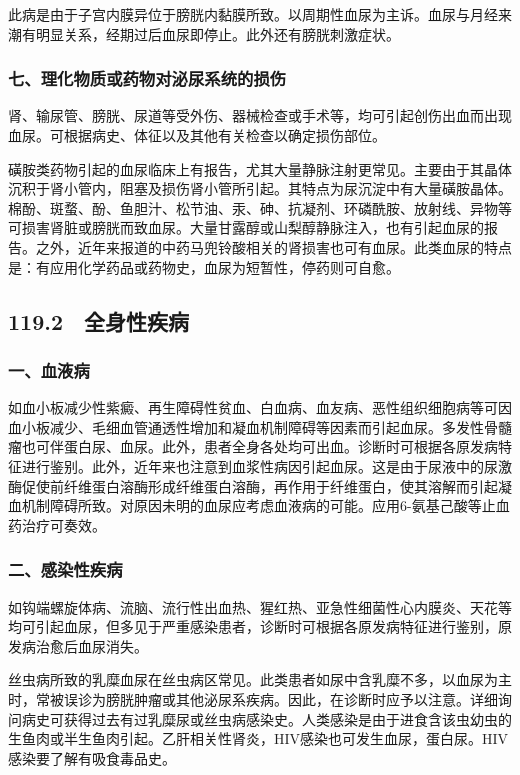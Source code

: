 此病是由于子宫内膜异位于膀胱内黏膜所致。以周期性血尿为主诉。血尿与月经来潮有明显关系，经期过后血尿即停止。此外还有膀胱刺激症状。

\subsubsection{七、理化物质或药物对泌尿系统的损伤}

肾、输尿管、膀胱、尿道等受外伤、器械检查或手术等，均可引起创伤出血而出现血尿。可根据病史、体征以及其他有关检查以确定损伤部位。

磺胺类药物引起的血尿临床上有报告，尤其大量静脉注射更常见。主要由于其晶体沉积于肾小管内，阻塞及损伤肾小管所引起。其特点为尿沉淀中有大量磺胺晶体。棉酚、斑蝥、酚、鱼胆汁、松节油、汞、砷、抗凝剂、环磷酰胺、放射线、异物等可损害肾脏或膀胱而致血尿。大量甘露醇或山梨醇静脉注入，也有引起血尿的报告。之外，近年来报道的中药马兜铃酸相关的肾损害也可有血尿。此类血尿的特点是：有应用化学药品或药物史，血尿为短暂性，停药则可自愈。

\protect\hypertarget{text00278.html}{}{}

\subsection{119.2　全身性疾病}

\subsubsection{一、血液病}

如血小板减少性紫癜、再生障碍性贫血、白血病、血友病、恶性组织细胞病等可因血小板减少、毛细血管通透性增加和凝血机制障碍等因素而引起血尿。多发性骨髓瘤也可伴蛋白尿、血尿。此外，患者全身各处均可出血。诊断时可根据各原发病特征进行鉴别。此外，近年来也注意到血浆性病因引起血尿。这是由于尿液中的尿激酶促使前纤维蛋白溶酶形成纤维蛋白溶酶，再作用于纤维蛋白，使其溶解而引起凝血机制障碍所致。对原因未明的血尿应考虑血液病的可能。应用6-氨基己酸等止血药治疗可奏效。

\subsubsection{二、感染性疾病}

如钩端螺旋体病、流脑、流行性出血热、猩红热、亚急性细菌性心内膜炎、天花等均可引起血尿，但多见于严重感染患者，诊断时可根据各原发病特征进行鉴别，原发病治愈后血尿消失。

丝虫病所致的乳糜血尿在丝虫病区常见。此类患者如尿中含乳糜不多，以血尿为主时，常被误诊为膀胱肿瘤或其他泌尿系疾病。因此，在诊断时应予以注意。详细询问病史可获得过去有过乳糜尿或丝虫病感染史。人类感染是由于进食含该虫幼虫的生鱼肉或半生鱼肉引起。乙肝相关性肾炎，HIV感染也可发生血尿，蛋白尿。HIV感染要了解有吸食毒品史。

